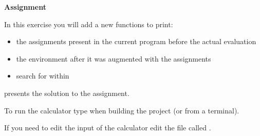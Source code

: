 {\bf Assignment}

In this exercise you will add a new functions to print:
\begin{itemize}
\item the assignments present in the current program before the actual evaluation
\item the environment after it was augmented with the assignments
\item search for  within 
\end{itemize}

 presents the solution to the assignment.

To run the calculator type  when building the project (or  from a terminal).

If you need to edit the input of the calculator edit the file called .
